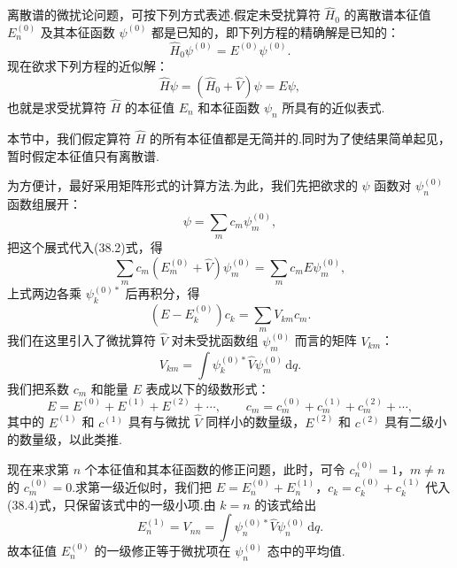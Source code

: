 离散谱的微扰论问题，可按下列方式表述.假定未受扰算符 $\hat{H}_0$ 的离散谱本征值 $E_n^{(0)}$ 及其本征函数 $\psi^{(0)}$ 都是已知的，即下列方程的精确解是已知的：
\begin{equation}
  \hat{H}_0\psi^{(0)}=E^{(0)}\psi^{(0)}.
\end{equation}
现在欲求下列方程的近似解：
\begin{equation}
  \hat{H}\psi=\left(\hat{H}_0+\hat{V}\right)\psi=E\psi,
\end{equation}
也就是求受扰算符 $\hat{H}$ 的本征值 $E_n$ 和本征函数 $\psi_n$ 所具有的近似表式.

本节中，我们假定算符 $\hat{H}$ 的所有本征值都是无简并的.同时为了使结果简单起见，暂时假定本征值只有离散谱.

为方便计，最好采用矩阵形式的计算方法.为此，我们先把欲求的 $\psi$ 函数对 $\psi_n^{(0)}$ 函数组展开：
\begin{equation}
  \psi=\sum_m c_m\psi_m^{(0)},
\end{equation}
把这个展式代入(38.2)式，得
\begin{equation*}
  \sum_m c_m\left(E_m^{(0)}+\hat{V}\right)\psi_m^{(0)}=\sum_m c_mE\psi_m^{(0)},
\end{equation*}
上式两边各乘 $\psi_k^{(0)*}$ 后再积分，得
\begin{equation}
  \left(E-E_k^{(0)}\right)c_k=\sum_m V_{km}c_m.
\end{equation}
我们在这里引入了微扰算符 $\hat{V}$ 对未受扰函数组 $\psi_m^{(0)}$ 而言的矩阵 $V_{km}$：
\begin{equation}
  V_{km}=\int\psi_k^{(0)*}\hat{V}\psi_m^{(0)}\,\mathrm{d}q.
\end{equation}
我们把系数 $c_m$ 和能量 $E$ 表成以下的级数形式：
\begin{equation*}
  E=E^{(0)}+E^{(1)}+E^{(2)}+\cdots,\qquad c_m=c_m^{(0)}+c_m^{(1)}+c_m^{(2)}+\cdots,
\end{equation*}
其中的 $E^{(1)}$ 和 $c^{(1)}$ 具有与微扰 $\hat{V}$ 同样小的数量级，$E^{(2)}$ 和 $c^{(2)}$ 具有二级小的数量级，以此类推.

现在来求第 $n$ 个本征值和其本征函数的修正问题，此时，可令 $c_n^{(0)}=1$，$m\neq n$ 的 $c_m^{(0)}=0$.求第一级近似时，我们把 $E=E_n^{(0)}+E_n^{(1)}$，$c_k=c_k^{(0)}+c_k^{(1)}$ 代入(38.4)式，只保留该式中的一级小项.由 $k=n$ 的该式给出
\begin{equation}
  E_n^{(1)}=V_{nn}=\int\psi_n^{(0)*}\hat{V}\psi_n^{(0)}\,\mathrm{d}q.
\end{equation}
故本征值 $E_n^{(0)}$ 的一级修正等于微扰项在 $\psi_n^{(0)}$ 态中的平均值.

